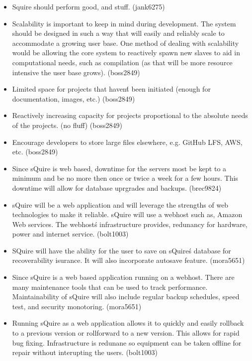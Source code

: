 \documentclass[11pt]{report}
\begin{document}
    \begin{itemize}
            \item Squire should perform good, and stuff. (jank6275)
            \item Scalability is important to keep in mind during development. The system should be designed in such a way that will easily and reliably scale to accommodate a growing user base. One method of dealing with scalability would be allowing the core system to reactively spawn new slaves to aid in computational needs, such as compilation (as that will be more resource intensive the user base grows). (boss2849)
            \item Limited space for projects that haven\'t been initiated (enough for documentation, images, etc.) (boss2849)
            \item Reactively increasing capacity for projects proportional to the absolute needs of the projects. (no fluff) (boss2849)
            \item Encourage developers to store large files elsewhere, e.g. GitHub LFS, AWS, etc. (boss2849)
            \item Since sQuire is web based, downtime for the servers most be kept to a minimum and be no more then once or twice a week for a few hours. This downtime will allow for database uprgrades and backups. (brec9824)
            \item sQuire will be a web application and will leverage the strengths of web technologies to make it reliable.       sQuire will use a webhost such as, Amazon Web services. The webhost\'s infrastructure provides, redunancy for hardware, power and internet service. (bolt1003)
            \item SQuire will have the ability for the user to save on sQuire\'s database for recoverability isurance. It will also incorporate autosave feature. (mora5651)
            \item Since sQuire is a web based application running on a webhost. There are 
            many maintenance tools that can be used to track performance. Maintainability of sQuire will also include regular backup schedules, speed test, and security monotoring. (mora5651)
            \item Running sQuire as a web application allows it to quickly and easily rollback to a previous version or rollforward to a new version. This allows for rapid bug fixing. Infrastructure is redunane so equipment can be taken offline for repair without interupting the users. (bolt1003)

\end{itemize}
\end{document}

